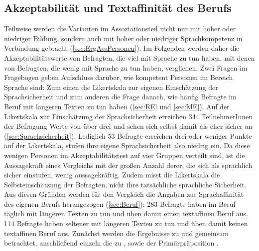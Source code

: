 \subsection{Akzeptabilität und Textaffinität des Berufs}
\label{sec:ErgAkzNachBeruf}
Teilweise werden die Varianten im Assoziationsteil nicht nur mit hoher oder niedriger Bildung, sondern auch mit hoher oder niedriger Sprachkompetenz in Verbindung gebracht (\autoref{sec:ErgAssPersonen}). 
Im Folgenden werden daher die Akzeptabilitätswerte von Befragten, die viel mit Sprache zu tun haben, mit denen von Befragten, die wenig mit Sprache zu tun haben, verglichen. 
Zwei Fragen im Fragebogen geben Aufschluss darüber, wie kompetent Personen im Bereich Sprache sind: 
Zum einen die Likertskala zur eigenen Einschätzung der Sprachsicherheit und zum anderen die Frage danach, wie häufig Befragte im Beruf mit längeren Texten zu tun haben (\autoref{sec:RE} und \autoref{sec:ME}). 
Auf der Likertskala zur Einschätzung der Sprachsicherheit erreichen 344 TeilnehmerInnen der Befragung Werte von über drei und sehen sich selbst damit als eher sicher an (\autoref{sec:Sprachsicherheit}). 
Lediglich 53 Befragte erreichen drei oder weniger Punkte auf der Likertskala, stufen ihre eigene Sprachsicherheit also niedrig ein. 
Da diese wenigen Personen im Akzeptabilitätstest auf vier Gruppen verteilt sind, ist die Aussagekraft eines Vergleichs mit der großen Anzahl derer, die sich als sprachlich sicher einstufen, wenig aussagekräftig. 
Zudem misst die Likertskala die Selbsteinschätzung der Befragten, nicht ihre tatsächliche sprachliche Sicherheit. 
Aus diesen Gründen werden für den Vergleich die Angaben zur Sprachaffinität des eigenen Berufs herangezogen (\autoref{sec:Beruf}): 
283 Befragte haben im Beruf täglich mit längeren Texten zu tun und üben damit einen textaffinen Beruf aus. 
114 Befragte haben seltener mit längeren Texten zu tun und üben damit keinen textaffinen Beruf aus. 
Zunächst werden die Ergebnisse zu \wegen{} und \waehrend{} gemeinsam betrachtet, anschließend einzeln die zu \dank{}, \gegenueber{} sowie der Primärpräposition . 

